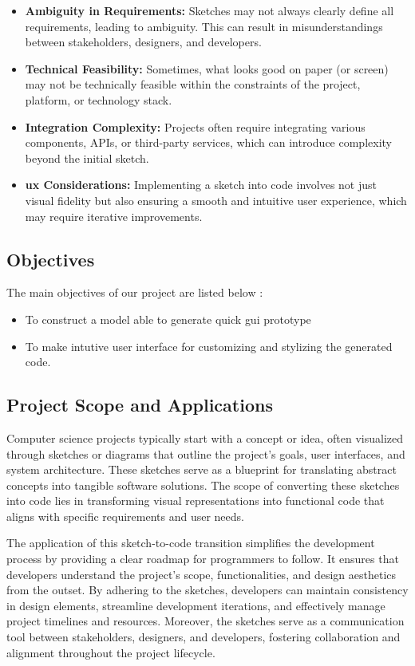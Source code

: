 \documentclass{ioereport}
\begin{document}
\begin{itemize}
    \item \textbf{Ambiguity in Requirements:} Sketches may not always clearly define all
    requirements, leading to ambiguity. This can result in misunderstandings
    between stakeholders, designers, and developers.
    \item \textbf{Technical Feasibility:} Sometimes, what looks good on paper (or screen) may
    not be technically feasible within the constraints of the project, platform, or
    technology stack. 
    \item \textbf{Integration Complexity:} Projects often require integrating various
    components, APIs, or third-party services, which can introduce complexity
    beyond the initial sketch.
    \item \textbf{\gls{ux} Considerations:} Implementing a sketch into code
    involves not just visual fidelity but also ensuring a smooth and intuitive user
    experience, which may require iterative improvements.
\end{itemize}
    \subsection{Objectives}
    The main objectives of our project are listed below :
    \begin{itemize}
        \item To construct a model able to generate quick \gls{gui} prototype
        \item To make intutive user interface for customizing and stylizing the generated
code.
    \end{itemize}
    
    \subsection{Project Scope and Applications}
    \sloppy
    Computer science projects typically start with a concept or idea, often visualized 
    through sketches or diagrams that outline the project's goals, user interfaces, and system
    architecture. These sketches serve as a blueprint for translating abstract concepts into
    tangible software solutions. The scope of converting these sketches into code lies in
    transforming visual representations into functional code that aligns with specific
    requirements and user needs.
    \unskip
    

The application of this sketch-to-code transition simplifies the development process by
providing a clear roadmap for programmers to follow. It ensures that developers
understand the project's scope, functionalities, and design aesthetics from the outset.
By adhering to the sketches, developers can maintain consistency in design elements,
streamline development iterations, and effectively manage project timelines and
resources. Moreover, the sketches serve as a communication tool between stakeholders,
designers, and developers, fostering collaboration and alignment throughout the project
lifecycle.
\end{document}
